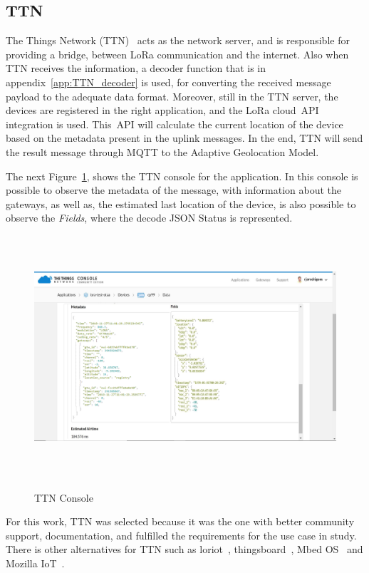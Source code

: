 \subsection{TTN} %
\label{sec:TTN}
The Things Network (TTN)~\cite{TTN} acts as the network server, and is responsible for providing a bridge, between LoRa communication and the internet. Also when TTN receives the information, a decoder function that is in appendix~\ref{app:TTN_decoder} is used, for converting the received message payload to the adequate data format.
Moreover, still in the TTN server, the devices are registered in the right application, and the LoRa cloud~\gls{API} integration is used. This~\gls{API} will calculate the current location of the device based on the metadata present in the uplink messages. In the end, TTN will send the result message through MQTT to the Adaptive Geolocation Model.

The next Figure~\ref{fig:TTN_Console}, shows the TTN console for the application. In this console is possible to observe the metadata of the message,  with information about the gateways, as well as, the estimated last location of the device, is also possible to observe the \emph{Fields}, where the decode JSON Status is represented.

\begin{figure}[htbp]
  \centering
  
    {\includegraphics[height=9cm,width=\linewidth]{Chapters/Figures/ttn.pdf}}
 
  \caption{TTN Console}
  \label{fig:TTN_Console}
\end{figure}

For this work, TTN was selected because it was the one with better community support, documentation, and fulfilled the requirements for the use case in study. There is other alternatives for TTN such as  loriot~\cite{Loriot}, thingsboard~\cite{ThingsBoard}, Mbed OS~\cite{Mbed} and Mozilla IoT~\cite{Mozilla}. 


